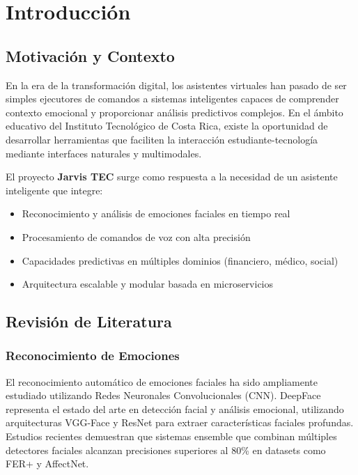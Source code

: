 
\chapter{Introducción}
\label{chap:intro}
\pagestyle{fancy}

\section{Motivación y Contexto}

En la era de la transformación digital, los asistentes virtuales han pasado de ser simples ejecutores de comandos a sistemas inteligentes capaces de comprender contexto emocional y proporcionar análisis predictivos complejos. En el ámbito educativo del Instituto Tecnológico de Costa Rica, existe la oportunidad de desarrollar herramientas que faciliten la interacción estudiante-tecnología mediante interfaces naturales y multimodales.

El proyecto \textbf{Jarvis TEC} surge como respuesta a la necesidad de un asistente inteligente que integre:
\begin{itemize}
    \item Reconocimiento y análisis de emociones faciales en tiempo real
    \item Procesamiento de comandos de voz con alta precisión
    \item Capacidades predictivas en múltiples dominios (financiero, médico, social)
    \item Arquitectura escalable y modular basada en microservicios
\end{itemize}

\section{Revisión de Literatura}

\subsection{Reconocimiento de Emociones}

El reconocimiento automático de emociones faciales ha sido ampliamente estudiado utilizando Redes Neuronales Convolucionales (CNN). DeepFace representa el estado del arte en detección facial y análisis emocional, utilizando arquitecturas VGG-Face y ResNet para extraer características faciales profundas. Estudios recientes  demuestran que sistemas ensemble que combinan múltiples detectores faciales alcanzan precisiones superiores al 80\% en datasets como FER+ y AffectNet.

